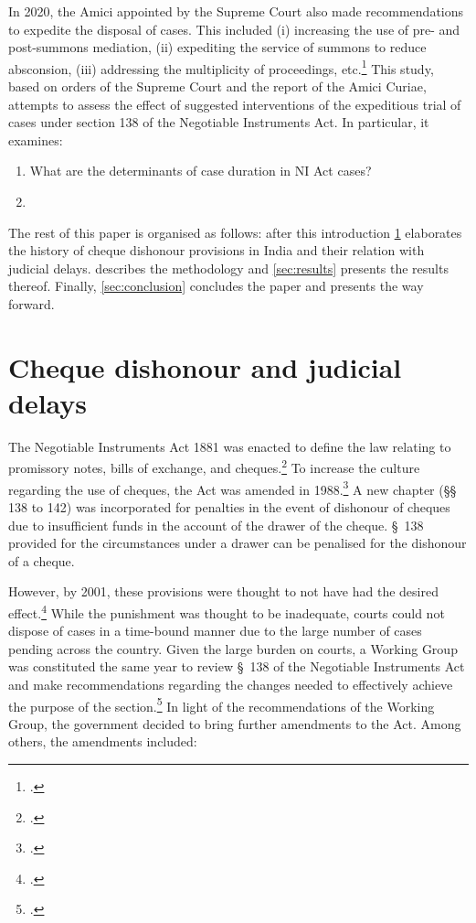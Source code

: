 In 2020, the Amici appointed by the Supreme Court also made recommendations to expedite the disposal of cases. This included (i) increasing the use of pre- and post-summons mediation, (ii) expediting the service of summons to reduce absconsion, (iii) addressing the multiplicity of proceedings, etc.\footcite{amicus2020_submission} This study, based on orders of the Supreme Court and the report of the Amici Curiae, attempts to assess the effect of suggested interventions of the expeditious trial of cases under section 138 of the Negotiable Instruments Act. In particular, it examines:

\begin{enumerate}
 \item What are the determinants of case duration in NI Act cases?
 \item 
\end{enumerate}

The rest of this paper is organised as follows: after this introduction \cref{sec:history} elaborates the history of cheque dishonour provisions in India and their relation with judicial delays.  describes the methodology and \cref{sec:results} presents the results thereof. Finally, \cref{sec:conclusion} concludes the paper and presents the way forward.

\section{Cheque dishonour and judicial delays}
\label{sec:history}

The Negotiable Instruments Act 1881 was enacted to define the law relating to promissory notes, bills of exchange, and cheques.\footcite{ind1881_niAct} To increase the culture regarding the use of cheques, the Act was amended in 1988.\footcite{niAmend1988} A new chapter (\S\S~ 138 to 142) was incorporated for penalties in the event of dishonour of cheques due to insufficient funds in the account of the drawer of the cheque. \S~138 provided for the circumstances under a drawer can be penalised for the dishonour of a cheque.

However, by 2001, these provisions were thought to not have had the desired effect.\footcite{stdcomm2001_138niAct} While the punishment was thought to be inadequate, courts could not dispose of cases in a time-bound manner due to the large number of cases pending across the country. Given the large burden on courts, a Working Group was constituted the same year to review \S~138 of the Negotiable Instruments Act and make recommendations regarding the changes needed to effectively achieve the purpose of the section.\footcite{wg2001_138} In light of the recommendations of the Working Group, the government decided to bring further amendments to the Act. Among others, the amendments included:

